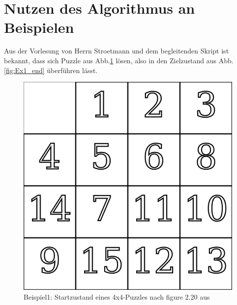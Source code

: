 \section{Nutzen des Algorithmus an Beispielen} %
\label{sec:PermutationExamples}
Aus der Vorlesung von Herrn Stroetmann und dem begleitenden Skript \autocite{github-stroetmann:online} ist bekannt, dass sich Puzzle aus Abb.\ref{fig:Ex1_start} lösen, also in den Zielzustand aus Abb.\ref{fig:Ex1_end} überführen lässt.\\
\begin{minipage}{\linewidth}
	\begin{minipage}[t]{0.45\linewidth}
		\begin{figure}[H]
			\centering
			\includegraphics[width=\linewidth,keepaspectratio]{img/Ex1_start.png}
			\captionsetup{format=plain, indention=0pt}
			\caption{Beispiel1: Startzustand eines 4x4-Puzzles nach figure 2.20 aus \autocite{github-stroetmann:online} \label{fig:Ex1_start}}
		\end{figure}
	\end{minipage}
	\hfill
	\begin{minipage}[t]{0.45\linewidth}
		\begin{figure}[H]
			\centering

\end{figure}
\end{minipage}
\end{minipage}
